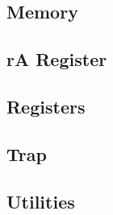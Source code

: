 \documentclass[a4paper,11pt]{report}
\begin{document}
\begin{appendices}
\subsection{Memory}\label{source:vm_memory}

\subsection{rA Register}\label{source:vm_register_ra}

\subsection{Registers}\label{source:vm_register}

\subsection{Trap}\label{source:vm_trap}

\subsection{Utilities}\label{source:vm_utilities}

\end{appendices}
\end{document}
